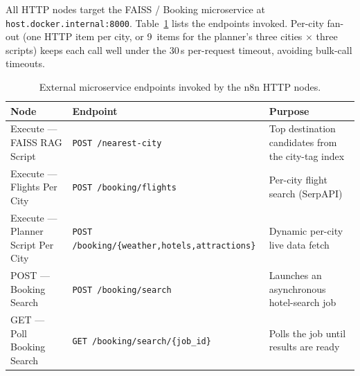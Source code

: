 \documentclass[12pt,a4paper]{report}
\begin{document}
\begin{appendices}
All HTTP nodes target the FAISS / Booking microservice at \texttt{host.docker.internal:8000}.
Table~\ref{tab:n8n-endpoints} lists the endpoints invoked. Per-city fan-out (one HTTP item per city,
or 9~items for the planner's three cities $\times$ three scripts) keeps each call well under the
30\,s per-request timeout, avoiding bulk-call timeouts.

\begin{table}[H]
\centering
\small
\renewcommand{\arraystretch}{1.3}
\begin{tabularx}{\textwidth}{
    >{\raggedright\arraybackslash}p{4.0cm}
    >{\raggedright\arraybackslash}p{4.6cm}
    >{\raggedright\arraybackslash}X}
\toprule
\textbf{Node} & \textbf{Endpoint} & \textbf{Purpose} \\
\midrule
Execute --- FAISS RAG Script    & \texttt{POST /nearest-city}                 & Top destination candidates from the city-tag index \\
Execute --- Flights Per City    & \texttt{POST /booking/flights}              & Per-city flight search (SerpAPI) \\
Execute --- Planner Script Per City & \texttt{POST /booking/\{weather,hotels,attractions\}} & Dynamic per-city live data fetch \\
POST --- Booking Search         & \texttt{POST /booking/search}               & Launches an asynchronous hotel-search job \\
GET --- Poll Booking Search     & \texttt{GET /booking/search/\{job\_id\}}    & Polls the job until results are ready \\
\bottomrule
\end{tabularx}
\caption{External microservice endpoints invoked by the n8n HTTP nodes.}
\label{tab:n8n-endpoints}
\end{table}

\end{appendices}
\end{document}
